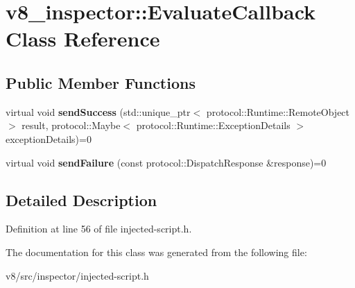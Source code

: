\hypertarget{classv8__inspector_1_1EvaluateCallback}{}\section{v8\+\_\+inspector\+:\+:Evaluate\+Callback Class Reference}
\label{classv8__inspector_1_1EvaluateCallback}
\subsection*{Public Member Functions}
\begin{DoxyCompactItemize}
\item 
\mbox{\label{classv8__inspector_1_1EvaluateCallback_afc8d0c46dbb21482f8870197fcd3d623}} 
virtual void {\bfseries send\+Success} (std\+::unique\+\_\+ptr$<$ protocol\+::\+Runtime\+::\+Remote\+Object $>$ result, protocol\+::\+Maybe$<$ protocol\+::\+Runtime\+::\+Exception\+Details $>$ exception\+Details)=0
\item 
\mbox{\label{classv8__inspector_1_1EvaluateCallback_a2f8083e41f1eafea8ce614fdac151d1f}} 
virtual void {\bfseries send\+Failure} (const protocol\+::\+Dispatch\+Response \&response)=0
\end{DoxyCompactItemize}


\subsection{Detailed Description}


Definition at line 56 of file injected-\/script.\+h.



The documentation for this class was generated from the following file\+:\begin{DoxyCompactItemize}
\item 
v8/src/inspector/injected-\/script.\+h\end{DoxyCompactItemize}
